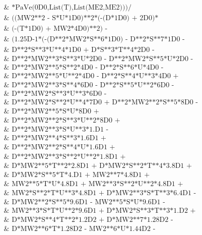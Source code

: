 \documentclass[../FeynCalcManual.tex]{subfiles}
\begin{document}
\begin{dmath*}
\begin{array}{l}
 \;\text{     $\&$      *PaVe(0D0,List(T),List(ME2,ME2)))/} \\
 \;\text{     $\&$   ((MW2**2 - S*U*1D0)**2*(-(D*1D0) + 2D0)*} \\
 \;\text{     $\&$     (-(T*1D0) + MW2*4D0)**2) - } \\
 \;\text{     $\&$  (1.25D-1*(-(D**2*MW2*S**6*1D0) - D**2*S**7*1D0 - } \\
 \;\text{     $\&$       D**2*S**3*U**4*1D0 + D*S**3*T**4*2D0 - } \\
 \;\text{     $\&$       D**2*MW2**3*S**3*U*2D0 - D**2*MW2*S**5*U*2D0 - } \\
 \;\text{     $\&$       D**2*MW2**5*S**2*4D0 - D**2*S**6*U*4D0 - } \\
 \;\text{     $\&$       D**2*MW2**5*U**2*4D0 - D**2*S**4*U**3*4D0 + } \\
 \;\text{     $\&$       D**2*MW2**3*S**4*6D0 - D**2*S**5*U**2*6D0 - } \\
 \;\text{     $\&$       D**2*MW2*S**3*U**3*6D0 - } \\
 \;\text{     $\&$       D**2*MW2*S**2*U**4*7D0 + D**2*MW2**2*S**5*8D0 - } \\
 \;\text{     $\&$       D**2*MW2**5*S*U*8D0 + } \\
 \;\text{     $\&$       D**2*MW2**2*S**3*U**2*8D0 + } \\
 \;\text{     $\&$       D**2*MW2**3*S*U**3*1.D1 - } \\
 \;\text{     $\&$       D**2*MW2**4*S**3*1.6D1 + } \\
 \;\text{     $\&$       D**2*MW2**2*S**4*U*1.6D1 + } \\
 \;\text{     $\&$       D**2*MW2**3*S**2*U**2*1.8D1 + } \\
 \;\text{     $\&$       D*MW2**5*T**2*2.8D1 + D*MW2*S**2*T**4*3.8D1 + } \\
 \;\text{     $\&$       D*MW2*S**5*T*4.D1 + MW2**7*4.8D1 + } \\
 \;\text{     $\&$       MW2**5*T*U*4.8D1 + MW2**3*S**2*U**2*4.8D1 + } \\
 \;\text{     $\&$       MW2*S**2*T*U**3*4.8D1 + D*MW2**3*S*T**3*6.4D1 - } \\
 \;\text{     $\&$       D*MW2**2*S**5*9.6D1 - MW2**5*S*U*9.6D1 - } \\
 \;\text{     $\&$       MW2**3*S*T*U**2*9.6D1 + D*MW2*S**3*T**3*1.D2 + } \\
 \;\text{     $\&$       D*MW2*S**4*T**2*1.2D2 + D*MW2**7*1.28D2 - } \\
 \;\text{     $\&$       D*MW2**6*T*1.28D2 - MW2**6*U*1.44D2 - } \\

\end{array}
\end{dmath*}
\end{document}
